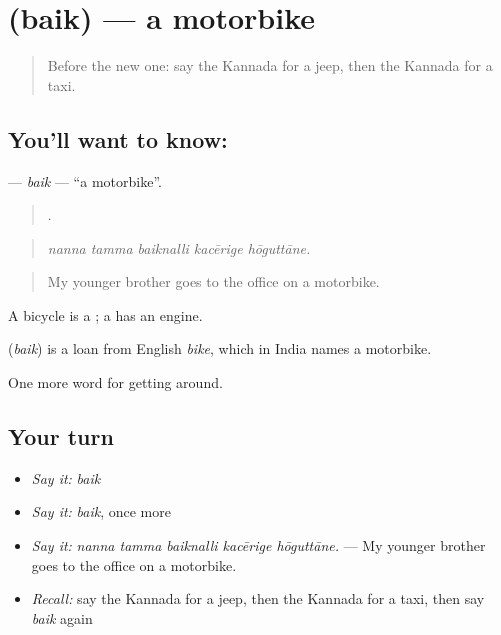 \section[\texorpdfstring{\kn{ಬೈಕ್} (baik)}{ಬೈಕ್ (baik)}]{ (baik) — a motorbike}

\label{lesson:KA-C451-baik}



\begin{quote}
Before the new one: say the Kannada for a jeep, then the Kannada for a taxi.
\end{quote}

\subsection*{You'll want to know: }
\textbf{} — \emph{baik} — \textquotedblleft{}a motorbike\textquotedblright{}.

\begin{quote}
    .
\end{quote}

\begin{quote}
\emph{nanna tamma baiknalli kacērige hōguttāne.}
\end{quote}

\begin{quote}
My younger brother goes to the office on a motorbike.
\end{quote}

A bicycle is a ; a  has an engine.

\begin{cousinweb}
\textbf{} (\emph{baik}) is a loan from English \emph{bike}, which in India names a motorbike.
\end{cousinweb}

\begin{grammarlens}[title={What you've built}]
One more word for getting around.
\end{grammarlens}

\subsection*{Your turn}
\begin{itemize}
\raggedright
  \item \emph{Say it:} \emph{baik}
  \item \emph{Say it:} \emph{baik}, once more
  \item \emph{Say it:} \emph{nanna tamma baiknalli kacērige hōguttāne.} — My younger brother goes to the office on a motorbike.
  \item \emph{Recall:} say the Kannada for a jeep, then the Kannada for a taxi, then say \emph{baik} again
\end{itemize}

